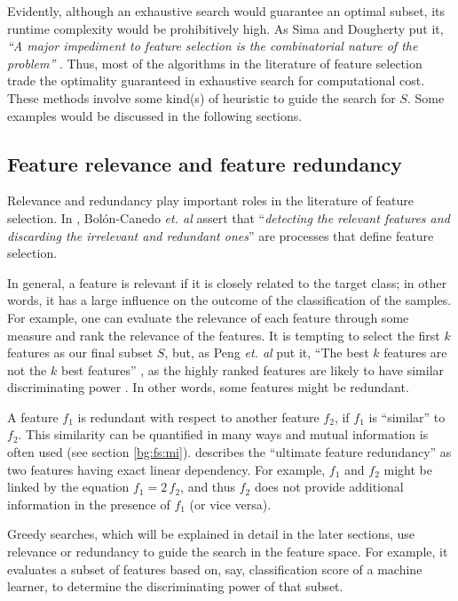 \documentclass[12pt, twoside, a4paper]{report}
\begin{document}
Evidently, although an exhaustive search would guarantee an optimal subset, its runtime complexity would be prohibitively high. As Sima and Dougherty put it, \textit{``A major impediment to feature selection is the combinatorial nature of the problem''} \cite{RefWorks:191}. Thus, most of the algorithms in the literature of feature selection trade the optimality guaranteed in exhaustive search for computational cost. These methods involve some kind(s) of heuristic to guide the search for $S$. Some examples would be discussed in the following sections.

\subsection{Feature relevance and feature redundancy} \label{bg:fs:relevance}

Relevance and redundancy play important roles in the literature of feature selection. In \cite{RefWorks:163}, Bolón-Canedo \textit{et. al} assert that ``\textit{detecting the relevant features and discarding the irrelevant and redundant ones}'' are processes that define feature selection.

In general, a feature is relevant if it is closely related to the target class; in other words, it has a large influence on the outcome of the classification of the samples. For example, one can evaluate the relevance of each feature through some measure and rank the relevance of the features. It is tempting to select the first $k$ features as our final subset $S$, but, as Peng \textit{et. al} put it, ``The best $k$ features are not the $k$ best features'' \cite{RefWorks:182}, as the highly ranked features are likely to have similar discriminating power \cite{RefWorks:163}. In other words, some features might be redundant.

A feature $f_1$ is redundant with respect to another feature $f_2$, if $f_1$ is ``similar'' to $f_2$. This similarity can be quantified in many ways and mutual information is often used (see section \ref{bg:fs:mi}). \cite{RefWorks:187} describes the ``ultimate feature redundancy'' as two features having exact linear dependency. For example, $f_1$ and $f_2$ might be linked by the equation $f_1 = 2 \, f_2$, and thus $f_2$ does not provide additional information in the presence of $f_1$ (or vice versa).

Greedy searches, which will be explained in detail in the later sections, use relevance or redundancy to guide the search in the feature space. For example, it evaluates a subset of features based on, say, classification score of a machine learner, to determine the discriminating power of that subset.
\end{document}
